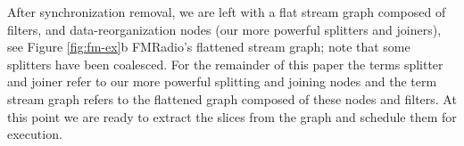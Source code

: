 After synchronization removal, we are left with a flat stream graph
composed of filters, and data-reorganization nodes (our more powerful
splitters and joiners), see Figure \ref{fig:fm-ex}b FMRadio's
flattened stream graph; note that some splitters have been
coalesced. For the remainder of this paper the terms splitter and
joiner refer to our more powerful splitting and joining nodes and the
term stream graph refers to the flattened graph composed of these
nodes and filters.  At this point we are ready to extract the slices
from the graph and schedule them for execution.

